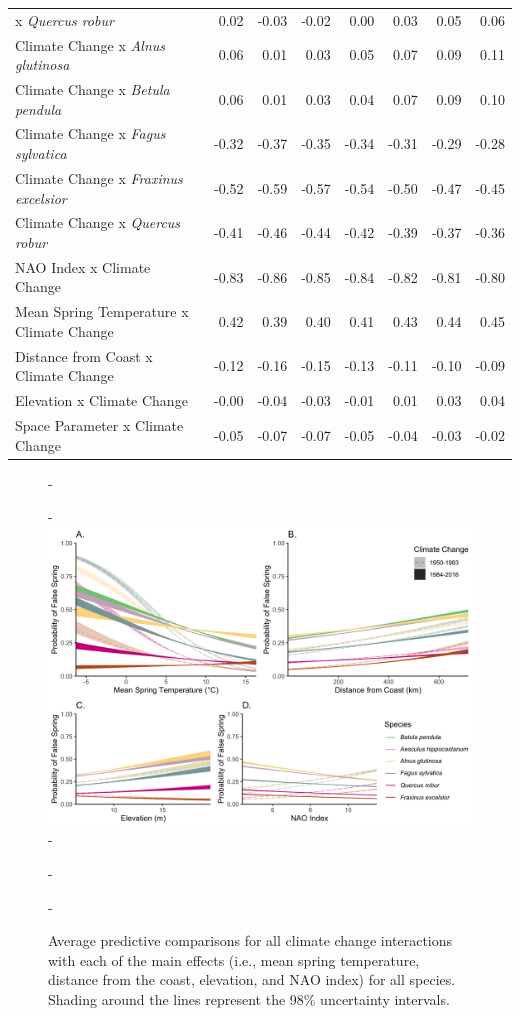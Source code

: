 \documentclass{article}\usepackage[]{graphicx}\usepackage[]{color}
\begin{document}
\begin{longtable}{lrrrrrrr}
x\textit{ Quercus robur} & 0.02 & -0.03 & -0.02 & 0.00 & 0.03 & 0.05 & 0.06 \\ 
  Climate Change
x\textit{ Alnus glutinosa} & 0.06 & 0.01 & 0.03 & 0.05 & 0.07 & 0.09 & 0.11 \\ 
  Climate Change
x\textit{ Betula pendula} & 0.06 & 0.01 & 0.03 & 0.04 & 0.07 & 0.09 & 0.10 \\ 
  Climate Change
x\textit{ Fagus sylvatica} & -0.32 & -0.37 & -0.35 & -0.34 & -0.31 & -0.29 & -0.28 \\ 
  Climate Change
x\textit{ Fraxinus excelsior} & -0.52 & -0.59 & -0.57 & -0.54 & -0.50 & -0.47 & -0.45 \\ 
  Climate Change
x\textit{ Quercus robur} & -0.41 & -0.46 & -0.44 & -0.42 & -0.39 & -0.37 & -0.36 \\ 
  NAO Index x Climate Change & -0.83 & -0.86 & -0.85 & -0.84 & -0.82 & -0.81 & -0.80 \\ 
  Mean Spring 
Temperature x Climate Change & 0.42 & 0.39 & 0.40 & 0.41 & 0.43 & 0.44 & 0.45 \\ 
  Distance from 
Coast x Climate Change & -0.12 & -0.16 & -0.15 & -0.13 & -0.11 & -0.10 & -0.09 \\ 
  Elevation x Climate Change & -0.00 & -0.04 & -0.03 & -0.01 & 0.01 & 0.03 & 0.04 \\ 
  Space Parameter x Climate Change & -0.05 & -0.07 & -0.07 & -0.05 & -0.04 & -0.03 & -0.02 \\ 
   \hline
\hline
\end{longtable}



{\begin{figure} [H]
  -\begin{center}
  -\includegraphics[width=16cm]{..//analyses/figures/APC_allpred_allspp_baseR_98.png}
  -\caption{Average predictive comparisons for all climate change interactions with each of the main effects (i.e., mean spring temperature, distance from the coast, elevation, and NAO index) for all species. Shading around the lines represent the 98\% uncertainty intervals. }\label{fig:suppapc}
  -\end{center}
  -\end{figure}}
  
\end{document}
